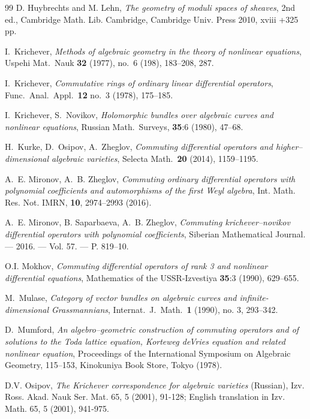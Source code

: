 \documentclass[11pt]{article}
\theoremstyle{definition}
\theoremstyle{plain}
\numberwithin{equation}{section}
\begin{document}
\begin{thebibliography}{99}
 D. Huybrechts and M. Lehn, {\it The geometry of moduli spaces of sheaves}, 2nd ed., Cambridge Math. Lib. Cambridge, Cambridge Univ. Press 2010, xviii +325 pp.


 I.~Krichever, \textit{Methods of algebraic geometry in the theory of nonlinear equations}, Uspehi Mat.~Nauk \textbf{32} (1977), no.~6 (198), 183--208, 287.

 I.~Krichever, \textit{Commutative rings of ordinary linear differential operators}, Func.~Anal.~Appl.~\textbf{12} no.~3 (1978), 175--185.

 I.~Krichever, S.~Novikov, \textit{Holomorphic bundles over algebraic curves and nonlinear equations}, Russian Math.~Surveys, {\bf 35}:6 (1980), 47--68.

 H.~Kurke, D.~Osipov, A.~Zheglov, \textit{Commuting differential operators and higher--dimensional algebraic varieties}, Selecta Math.~{\bf 20} (2014),  1159--1195.


 A.~E. Mironov, A.~B. Zheglov, \textit{Commuting ordinary differential operators with polynomial coefficients and automorphisms of the first Weyl algebra}, Int. Math. Res. Not. IMRN, {\bf 10}, 2974--2993 (2016).

 A.~E. Mironov, B. Saparbaeva, A.~B. Zheglov, {\it Commuting krichever–novikov differential operators with polynomial coefficients}, Siberian Mathematical Journal. — 2016. — Vol. 57. — P. 819–10. 

 O.I. Mokhov, \textit{Commuting differential operators of rank 3 and nonlinear differential equations},  Mathematics of the USSR-Izvestiya {\bf 35}:3 (1990), 629--655.


 M.~Mulase,  \emph{Category of vector bundles on algebraic curves and infinite-dimensional Grassmannians}, Internat.~J.~Math.~\textbf{1} (1990), no. 3, 293--342.

 D.~Mumford,  \emph{An algebro--geometric construction of commuting operators and of solutions to the Toda lattice equation, Korteweg deVries equation and related nonlinear equation},  Proceedings of the International Symposium on Algebraic Geometry, 115--153, Kinokuniya Book Store, Tokyo (1978).


 D.V. Osipov,
{\em  The Krichever correspondence for algebraic varieties}
(Russian), Izv. Ross. Akad. Nauk Ser. Mat. 65, 5 (2001), 91-128;
English translation in Izv. Math. 65, 5 (2001), 941-975.


\end{thebibliography}
\end{document}
